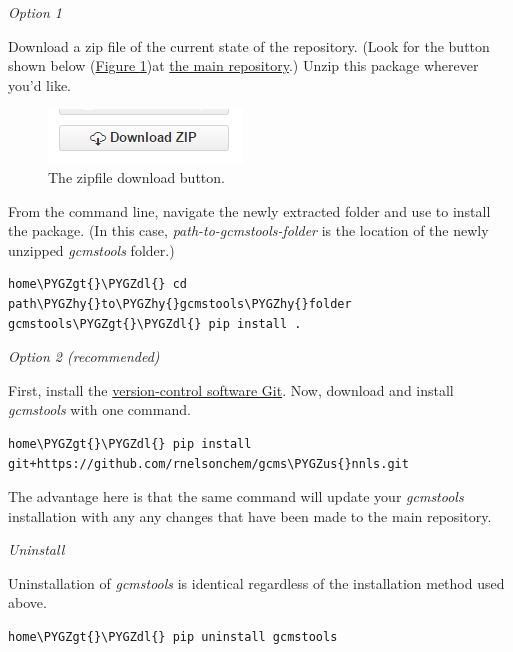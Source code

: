 \documentclass[letterpaper,10pt,english]{sphinxmanual}
\def\PYGZus{\char`\_}
\def\PYGZgt{\char`\>}
\def\PYGZdl{\char`\$}
\def\PYGZhy{\char`\-}
\begin{document}
\emph{Option 1}

Download a zip file of the current state of the repository. (Look for the
button shown below (\hyperref[intro:gitzip]{Figure  \ref*{intro:gitzip}})at \href{https://github.com/rnelsonchem/gcms\_nnls}{the main repository}.) Unzip
this package wherever you'd like.
\begin{figure}[htbp]
\centering
\capstart

\includegraphics{git_zip.png}
\caption{The zipfile download button.}\label{intro:gitzip}\end{figure}

From the command line, navigate the newly extracted folder and use  to
install the package. (In this case, \emph{path-to-gcmstools-folder} is the location
of the newly unzipped \emph{gcmstools} folder.)

\begin{Verbatim}[commandchars=\\\{\}]
home\PYGZgt{}\PYGZdl{} cd path\PYGZhy{}to\PYGZhy{}gcmstools\PYGZhy{}folder
gcmstools\PYGZgt{}\PYGZdl{} pip install .
\end{Verbatim}

\emph{Option 2 (recommended)}

First, install the \href{http://git-scm.com/}{version-control software Git}. Now, download and install
\emph{gcmstools} with one command.

\begin{Verbatim}[commandchars=\\\{\}]
home\PYGZgt{}\PYGZdl{} pip install git+https://github.com/rnelsonchem/gcms\PYGZus{}nnls.git
\end{Verbatim}

The advantage here is that the same command will update your \emph{gcmstools}
installation with any any changes that have been made to the main repository.

\emph{Uninstall}

Uninstallation of \emph{gcmstools} is identical regardless of the installation
method used above.

\begin{Verbatim}[commandchars=\\\{\}]
home\PYGZgt{}\PYGZdl{} pip uninstall gcmstools
\end{Verbatim}
\end{document}
